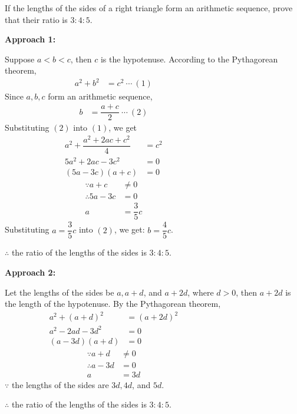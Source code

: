 \documentclass{report}
\begin{document}
\newpage
\begin{question}
    If the lengths of the sides of a right triangle form an arithmetic sequence, prove that their ratio is $3: 4: 5$.

    \proof{}

    \noindent\textbf{Approach 1:}

    \noindent Suppose $a < b < c$, then $c$ is the hypotenuse. According to the Pythagorean theorem,
    \begin{align*}
        a^2 + b^2 & = c^2\ \cdots\ (1) &&&&&&&&&&&&
    \end{align*}
    Since $a, b, c$ form an arithmetic sequence,
    \begin{align*}
        b &= \dfrac{a+c}{2}\ \cdots\ (2) &&&&&&&&&&&&
    \end{align*}
    Substituting $(2)$ into $(1)$, we get
    \begin{align*}
        a^{2}+\dfrac{a^{2}+2 a c+c^{2}}{4}&=c^{2} &&&&&&&&&&&& \\
        5 a^{2}+2 a c-3 c^{2}&=0 \\
        (5 a-3 c)(a+c)&=0
    \end{align*}
    \vspace{-3.5em}
    \begin{align*}
        \because a+c &\neq 0 &&&&&&&&&&&& \\
        \therefore 5 a-3 c&=0 \\
        a&=\dfrac{3}{5} c
    \end{align*}
    Substituting $a=\dfrac{3}{5} c$ into $(2)$, we get: $b=\dfrac{4}{5} c$.
    
    \vspace{-1em}
    \noindent $\therefore$ the ratio of the lengths of the sides is $3:4:5$.

    \noindent\textbf{Approach 2:}

    \noindent Let the lengths of the sides be $a, a+d$, and $a+2d$, where $d>0$, then $a+2d$ is the length of the hypotenuse. By the Pythagorean theorem,
    \begin{align*}
    a^{2}+(a+d)^{2}&=(a+2 d)^{2} &&&&&&&&&&&& \\
    a^{2}-2 a d-3 d^{2}&=0 \\
    (a-3 d)(a+d)&=0
    \end{align*}
    \vspace{-3.5em}
    \begin{align*}
    \because a+d &\neq 0 &&&&&&&&&&&& \\
    \therefore a-3 d&=0 \\
    a&=3 d
    \end{align*}
    $\because$ the lengths of the sides are $3 d, 4 d$, and $5 d$.

    \vspace{-1em}
    \noindent $\therefore$ the ratio of the lengths of the sides is $3:4:5$.
\end{question}
\end{document}
